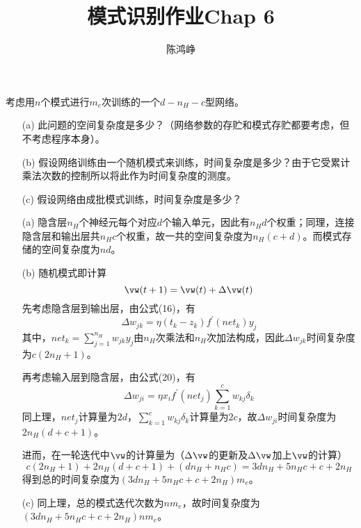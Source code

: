 \documentclass[reportComp]{thesis}
\title{模式识别作业Chap 6}
\author{陈鸿峥}
\begin{document}
\maketitle

\begin{question}[\textsection 6 Q3]
考虑用$n$个模式进行$m_e$次训练的一个$d-n_H-c$型网络。
\begin{itemize}
	\item [(a)] 此问题的空间复杂度是多少？（网络参数的存贮和模式存贮都要考虑，但不考虑程序本身）。
	\item [(b)] 假设网络训练由一个随机模式来训练，时间复杂度是多少？由于它受累计乘法次数的控制所以将此作为时间复杂度的测度。
	\item [(c)] 假设网络由成批模式训练，时间复杂度是多少？
\end{itemize}
\end{question}
\begin{answer}
\begin{itemize}
	\item [(a)] 隐含层$n_H$个神经元每个对应$d$个输入单元，因此有$n_Hd$个权重；同理，连接隐含层和输出层共$n_Hc$个权重，故一共的空间复杂度为$n_H(c+d)$。而模式存储的空间复杂度为$nd$。

	\item [(b)] 随机模式即计算
	\[\vw(t+1)=\vw(t)+\Delta\vw(t)\]
	先考虑隐含层到输出层，由公式(16)，有
	\[\Delta w_{j k}=\eta\left(t_{k}-z_{k}\right) f^{\prime}\left(net_{k}\right) y_{j}\]
	其中，$net_k=\sum_{j=1}^{n_H}w_{jk}y_j$由$n_H$次乘法和$n_H$次加法构成，因此$\Delta w_{jk}$时间复杂度为$c(2n_H+1)$。

	再考虑输入层到隐含层，由公式(20)，有
	\[\Delta w_{j i}=\eta x_{i} f^{\prime}\left(net_{j}\right) \sum_{k=1}^{c} w_{k j} \delta_{k}\]
	同上理，$net_j$计算量为$2d$，$\sum_{k=1}^{c} w_{k j} \delta_{k}$计算量为$2c$，故$\Delta w_{ji}$时间复杂度为$2n_H(d+c+1)$。

	进而，在一轮迭代中$\vw$的计算量为（$\Delta \vw$的更新及$\Delta\vw$加上$\vw$的计算）
	\[c(2n_H+1)+2n_H(d+c+1)+(dn_H+n_Hc)=3dn_H+5n_Hc+c+2n_H\]
	得到总的时间复杂度为$(3dn_H+5n_Hc+c+2n_H)m_e$。

	\item [(c)] 同上理，总的模式迭代次数为$nm_e$，故时间复杂度为$(3dn_H+5n_Hc+c+2n_H)n m_e$。
\end{itemize}
\end{answer}
\end{document}

